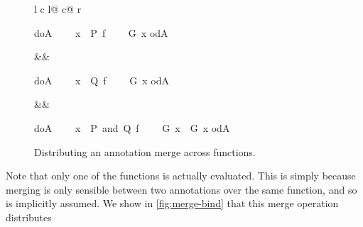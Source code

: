 \documentclass[submission]{eptcs}
\newcommand{\isafun}[1]{{\sf #1}}
\begin{document}
\begin{isabellebody}
\begin{isamarkuptext}
\begin{center}
\end{center}
\begin{figure}[tb]
\begin{tabular}{l c l@ {\hspace{24 pt}}c@ {\hspace{12 pt}}r}
\begin{minipage}[t]{0.12\textwidth}
\begin{isabelle}\isafun{doA}\isanewline
\ \ \ \ x\ {}\ {}P{}\ f{}\isanewline
\ \ \ \ G\ x\isanewline
\isafun{odA}\end{isabelle}
\end{minipage}
&&
\begin{minipage}[t]{0.12\textwidth}
\begin{isabelle}\isafun{doA}\isanewline
\ \ \ \ x\ {}\ {}Q{}\ f{}\isanewline
\ \ \ \ G{}\ x\isanewline
\isafun{odA}\end{isabelle}
\end{minipage}
&&
\begin{minipage}[t]{0.2\textwidth}
\begin{isabelle}\isafun{doA}\isanewline
\ \ \ \ x\ {}\ {}P\ and\ Q{}\ f{}\isanewline
\ \ \ \ G\ x\ {}\ G{}\ x\isanewline
\isafun{odA}\end{isabelle}
\end{minipage}
\end{tabular}
\caption{Distributing an annotation merge across functions.\label{fig:merge-bind}}
\end{figure}
Note that only one of the functions  is actually evaluated.
This is simply because merging is only sensible between
two annotations over the same function, and so
\isa{\isafun{dropA}\ F\ s\ {\isaliteral{3D}{\isacharequal}}\ \isafun{dropA}\ G\ s} is implicitly assumed.
We show in \autoref{fig:merge-bind} that this merge operation distributes

\end{isamarkuptext}
\end{isabellebody}
\end{document}
